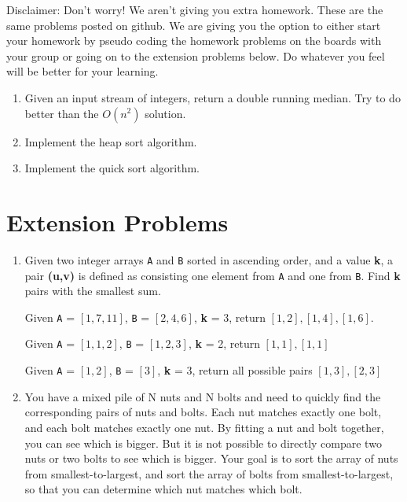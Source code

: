 \documentclass{article}
\begin{document}
	 Disclaimer: Don't worry! We aren't giving you extra homework. These are the same problems posted on github. We are giving you the option to either start your homework by pseudo coding the homework problems on the boards with your group or going on to the extension problems below. Do whatever you feel will be better for your learning.
	 \begin{enumerate}
	     \item Given an input stream of integers, return a double running median. Try to do better than the $O(n^2)$ solution.

	     \item Implement the heap sort algorithm.

	     \item Implement the quick sort algorithm.

	 \end{enumerate}

	 \section*{Extension Problems}

	     \begin{enumerate}
	\item Given two integer arrays \texttt{A} and \texttt{B} sorted in ascending order, and a value \textbf{k}, a pair \textbf{(u,v)} is defined as consisting one element from \texttt{A} and one from \texttt{B}. Find \textbf{k} pairs with the smallest sum.

	      Given \texttt{A} = $[1,7,11]$, \texttt{B} = $[2,4,6]$, \textbf{k} = 3, return $[1,2], [1,4], [1,6]$.

	      Given \texttt{A} = $[1,1,2]$, \texttt{B} = $[1,2,3]$, \textbf{k} = 2, return $[1,1], [1,1]$

	      Given \texttt{A} = $[1,2]$, \texttt{B} = $[3]$, \textbf{k} = 3, return all possible pairs $[1,3], [2,3]$

	\item You have a mixed pile of N nuts and N bolts and need to quickly find the corresponding pairs of nuts and bolts. Each nut matches exactly one bolt, and each bolt matches exactly one nut. By fitting a nut and bolt together, you can see which is bigger. But it is not possible to directly compare two nuts or two bolts to see which is bigger. Your goal is to sort the array of nuts from smallest-to-largest, and sort the array of bolts from smallest-to-largest, so that you can determine which nut matches which bolt.

\end{enumerate}
\end{document}

